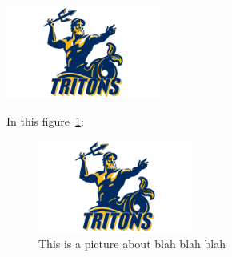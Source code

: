 \documentclass[letterpaper, notitlepage, 12pt]{article}
\begin{document}
\includegraphics[width=2in]{gl-5-triton.png}

In this figure~\ref{picture}:
\begin{figure}[t]
\begin{center}
\includegraphics[width=2in]{gl-5-triton.png}
\end{center}
\caption{\label{picture} This is a picture about blah blah blah}
\end{figure}

\newpage
\listoftables
\listoffigures
\end{document}
